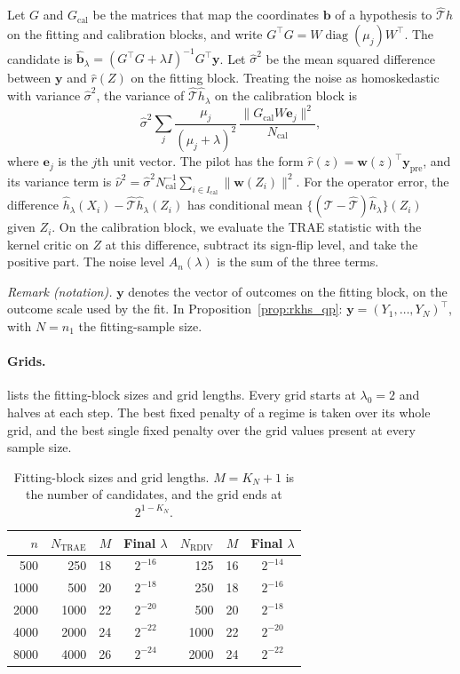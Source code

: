 Let $G$ and $G_{\mathrm{cal}}$ be the matrices that map the coordinates $\boldsymbol b$ of a hypothesis to $\hat{\mathcal T}h$ on the fitting and calibration blocks, and write $G^\top G=W\operatorname{diag}(\mu_j)W^\top$. The candidate is $\hat{\boldsymbol b}_\lambda=(G^\top G+\lambda I)^{-1}G^\top\boldsymbol y$. Let $\hat\sigma^2$ be the mean squared difference between $\boldsymbol y$ and $\hat r(Z)$ on the fitting block. Treating the noise as homoskedastic with variance $\hat\sigma^2$, the variance of $\hat{\mathcal T}\hat h_\lambda$ on the calibration block is
\[
\hat\sigma^2\sum_j\frac{\mu_j}{(\mu_j+\lambda)^2}\,\frac{\|G_{\mathrm{cal}}W\boldsymbol e_j\|^2}{N_{\mathrm{cal}}},
\]
where $\boldsymbol e_j$ is the $j$th unit vector. The pilot has the form $\hat r(z)=\boldsymbol w(z)^\top\boldsymbol y_{\mathrm{pre}}$, and its variance term is $\hat\nu^2=\hat\sigma^2N_{\mathrm{cal}}^{-1}\sum_{i\in I_{\mathrm{cal}}}\|\boldsymbol w(Z_i)\|^2$. For the operator error, the difference $\hat h_\lambda(X_i)-\hat{\mathcal T}\hat h_\lambda(Z_i)$ has conditional mean $\{(\mathcal T-\hat{\mathcal T})\hat h_\lambda\}(Z_i)$ given $Z_i$. On the calibration block, we evaluate the TRAE statistic with the kernel critic on $Z$ at this difference, subtract its sign-flip level, and take the positive part. The noise level $A_n(\lambda)$ is the sum of the three terms.

\noindent\textit{Remark (notation).} $\boldsymbol y$ denotes the vector of outcomes on the fitting block, on the outcome scale used by the fit. In Proposition~\ref{prop:rkhs_qp}: $\boldsymbol y=(Y_1,\ldots,Y_N)^\top$, with $N=n_1$ the fitting-sample size.


\paragraph{Grids.}
 lists the fitting-block sizes and grid lengths. Every grid starts at $\lambda_0=2$ and halves at each step. The best fixed penalty of a regime is taken over its whole grid, and the best single fixed penalty over the grid values present at every sample size.

\begin{table}[!htp]
\centering
\caption{Fitting-block sizes and grid lengths. $M=K_N+1$ is the number of candidates, and the grid ends at $2^{1-K_N}$.}
\label{tab:experiment_grid}
\small
\begin{tabular}{r r r c r r c}
\toprule
$n$ & $N_{\mathrm{TRAE}}$ & $M$ & Final $\lambda$ & $N_{\mathrm{RDIV}}$ & $M$ & Final $\lambda$\\
\midrule
500 & 250 & 18 & $2^{-16}$ & 125 & 16 & $2^{-14}$\\
1000 & 500 & 20 & $2^{-18}$ & 250 & 18 & $2^{-16}$\\
2000 & 1000 & 22 & $2^{-20}$ & 500 & 20 & $2^{-18}$\\
4000 & 2000 & 24 & $2^{-22}$ & 1000 & 22 & $2^{-20}$\\
8000 & 4000 & 26 & $2^{-24}$ & 2000 & 24 & $2^{-22}$\\
\bottomrule
\end{tabular}
\end{table}

